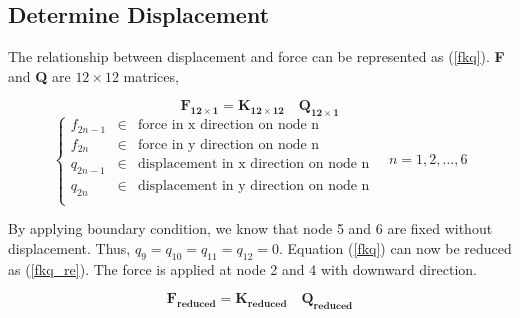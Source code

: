 \documentclass[12pt, a4paper]{article}
\begin{document}
\subsection{Determine Displacement} 
    \qquad The relationship between displacement and force can be represented as (\ref{fkq}). \textbf{F} and \textbf{Q} are  $12\times12$ matrices, 
    
    \begin{equation}
        \label{fkq}
        \mathbf{F_{12\times1}=K_{12\times12}\quad Q_{12\times1}}
    \end{equation}
    \begin{equation*}
        \left\{ 
        \begin{array}{ccc}
            f_{2n-1} & \in & \textrm{force in x direction on node n}\\
            f_{2n} & \in & \textrm{force in y direction on node n}\\
            q_{2n-1} & \in & \textrm{displacement in x direction on node n}\\
            q_{2n} & \in & \textrm{displacement in y direction on node n}\\
        \end{array}
        \right.
        \quad n=1,2,\ldots,6
    \end{equation*}
    
    \qquad By applying boundary condition, we know that node 5 and 6 are fixed without displacement. Thus, $q_9=q_{10}=q_{11}=q_{12}=0$. Equation (\ref{fkq}) can now be reduced as (\ref{fkq_re}). The force is applied at node 2 and 4 with downward direction.
    
    \begin{equation}
        \label{fkq_re}
        \mathbf{F_{reduced}=K_{reduced}\quad Q_{reduced}}
    \end{equation}
    
\end{document}
